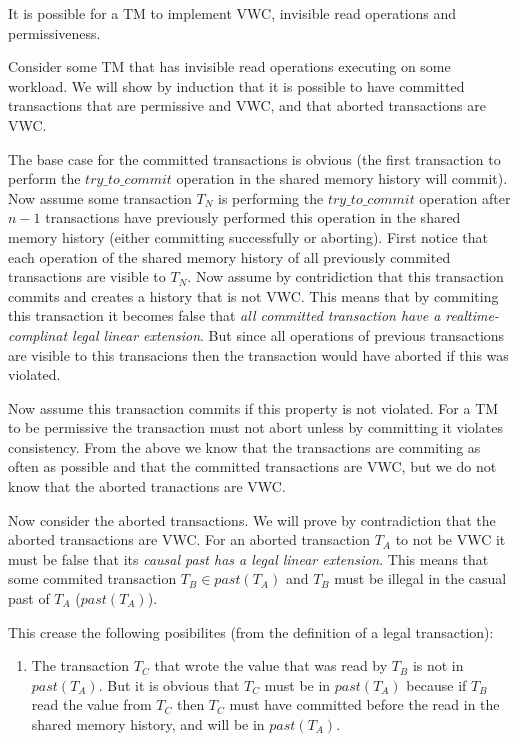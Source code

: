 \begin{theorem}
\label{vwcinvisperm} 
It is possible for a TM to implement VWC, invisible read operations and permissiveness.
\end{theorem}
\vspace{-0.15cm}
\begin{proofT}

Consider some TM that has invisible read operations executing on some workload.
We will show by induction that it is possible to have committed transactions that are permissive and VWC, and that aborted transactions are VWC.

The base case for the committed transactions is obvious (the first transaction to perform the $try\_to\_commit$ operation in the shared memory history will commit).
Now assume some transaction $T_N$ is performing the $try\_to\_commit$ operation after $n-1$ transactions have previously performed this operation in the shared memory history (either committing successfully or aborting).
First notice that each operation of the shared memory history of all previously commited transactions are visible to $T_N$.
Now assume by contridiction that this transaction commits and creates a history that is not VWC.
This means that by commiting this transaction it becomes false that \emph{all committed transaction have a realtime-complinat legal linear extension}.
But since all operations of previous transactions are visible to this transacions then the transaction would have aborted if this was violated.

Now assume this transaction commits if this property is not violated.
For a TM to be permissive the transaction must not abort unless by committing it violates consistency.
From the above we know that the transactions are commiting as often as possible and that the committed transactions are VWC, but we do not know that the aborted tranactions are VWC.

Now consider the aborted transactions.
We will prove by contradiction that the aborted transactions are VWC.
For an aborted transaction $T_A$ to not be VWC it must be false that its \emph{causal past has a legal linear extension}.
This means that some commited transaction $T_B \in past(T_A)$ and $T_B$ must be illegal in the casual past of $T_A$ ($past(T_A)$).

This crease the following posibilites (from the definition of a legal transaction):
\begin{enumerate}

\item \label{poss1} The transaction $T_C$ that wrote the value that was read by $T_B$ is not in $past(T_A)$.
But it is obvious that $T_C$ must be in $past(T_A)$ because if $T_B$ read the value from $T_C$ then $T_C$ must have committed before the read in the shared memory history, and will be in $past(T_A)$.


\end{enumerate}
\end{proofT}
